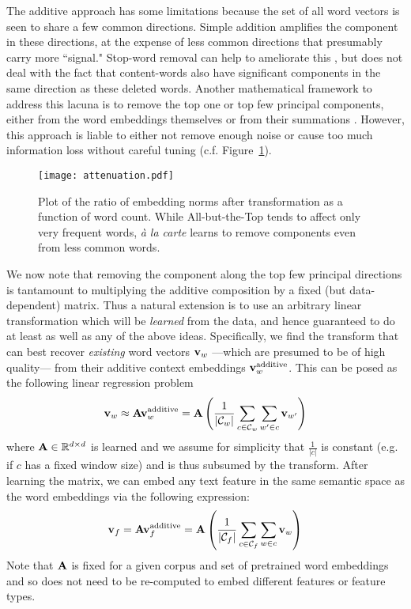 \documentclass[11pt,a4paper]{article}
\begin{document}
The additive approach has some limitations because the set of all word vectors is seen to share a few common directions. 
Simple addition amplifies the component in these directions, at the expense of less common directions that presumably carry more ``signal."
Stop-word removal can help to ameliorate this \cite{Lazaridou:17,Herbelot:17}, but does not deal with the fact that content-words also have significant components in the same direction as these deleted words.
Another mathematical framework to address this lacuna is to remove the top one or top few principal components, either from the word embeddings themselves \cite{Mu:18} or from their summations \cite{Arora:17}.
However, this approach is liable to either not remove enough noise or cause too much information loss without careful tuning (c.f. Figure~\ref{fig:avov}).

\begin{figure}[t!]
	\texttt{[image: attenuation.pdf]}
	\caption{\label{fig:avov}
		Plot of the ratio of embedding norms after transformation as a function of word count.
		While All-but-the-Top tends to affect only very frequent words, {\em\`a la carte} learns to remove components even from less common words.
	}
\end{figure}

We now note that removing the component along the top few principal directions is tantamount to multiplying the additive composition by a fixed (but data-dependent) matrix.
Thus a natural extension is to use an arbitrary linear transformation which will be {\em learned} from the data, and hence guaranteed to do at least as well as any of the above ideas.
Specifically, we find the transform that can best recover {\em existing} word vectors ${\bf v}_w$ ---which are presumed to be of high quality--- from their additive context embeddings ${\bf v}_w^\textrm{additive}$.
This can be posed as the following linear regression problem
\begin{equation}\label{eq:regression}
	{\bf v}_w\approx {\bf Av}_w^\textrm{additive}={\bf A}\left(\frac{1}{|\mathcal{C}_w|}\sum\limits_{c\in\mathcal{C}_w}\sum\limits_{w'\in c}{\bf v}_{w'}\right)
\end{equation}
where ${\bf A}\in\mathbb{R}^{d\times d}$ is learned and we assume for simplicity that $\frac{1}{|c|}$ is constant (e.g. if $c$ has a fixed window size) and is thus subsumed by the transform.
After learning the matrix, we can embed any text feature in the same semantic space as the word embeddings via the following expression:
\begin{equation}\label{eq:alacarte}
	{\bf v}_f={\bf Av}_f^\textrm{additive}={\bf A}\left(\frac{1}{|\mathcal{C}_f|}\sum\limits_{c\in\mathcal{C}_f}\sum\limits_{w\in c}{\bf v}_w\right)
\end{equation}
Note that ${\bf A}$ is fixed for a given corpus and set of pretrained word embeddings and so does not need to be re-computed to embed different features or feature types. 
\end{document}
